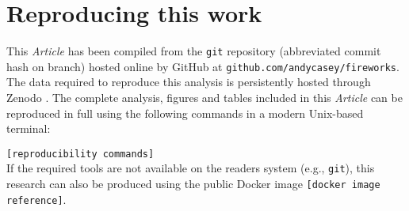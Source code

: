 \documentclass[useAMS,usenatbib]{mn2e}
\newcommand\article{\textit{Article}}
\begin{document}
\appendix
\section{Reproducing this work}
\label{appendix:reproducibility}

This \article{} has been compiled from the \texttt{git} repository (abbreviated commit hash \texttt{\gitAbbrevHash} on \texttt{\gitBranch} branch) hosted online by GitHub at \texttt{github.com/andycasey/fireworks}. The data required to reproduce this analysis is persistently hosted through Zenodo \citep{DATA}. The complete analysis, figures and tables included in this \article{} can be reproduced in full using the following commands in a modern Unix-based terminal:
\vspace{0.5em}

\noindent\texttt{[reproducibility commands]} 
\vspace{0.5em} \\
If the required tools are not available on the readers system (e.g., \texttt{git}), this research can also be produced using the public Docker image \texttt{[docker image reference]}.
\end{document}
